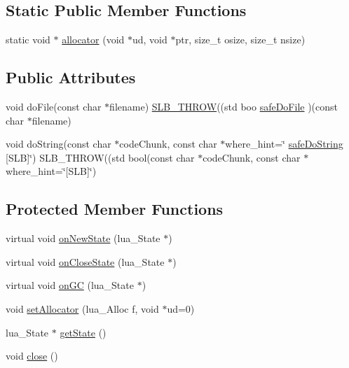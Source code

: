 \subsection*{Static Public Member Functions}
\begin{DoxyCompactItemize}
\item 
static void $\ast$ \hyperlink{classSLB_1_1Script_a7e26074d7437d72c2d6c4008a972ee17}{allocator} (void $\ast$ud, void $\ast$ptr, size\+\_\+t osize, size\+\_\+t nsize)
\end{DoxyCompactItemize}
\subsection*{Public Attributes}
\begin{DoxyCompactItemize}
\item 
void do\+File(const char $\ast$filename) \hyperlink{SLB_8hpp_a26bfc413cbc785925c2a46cfbab5d398}{S\+L\+B\+\_\+\+T\+H\+R\+OW}((std boo \hyperlink{classSLB_1_1Script_a98df15c9ceb5740e79b6ba3246265125}{safe\+Do\+File} )(const char $\ast$filename)
\item 
void do\+String(const char $\ast$code\+Chunk, const char $\ast$where\+\_\+hint=\char`\"{} \hyperlink{classSLB_1_1Script_a7ee7f0a0a77753eea4705df0ff3ec23c}{safe\+Do\+String} \mbox{[}S\+LB\mbox{]}\char`\"{}) S\+L\+B\+\_\+\+T\+H\+R\+OW((std bool(const char $\ast$code\+Chunk, const char $\ast$where\+\_\+hint=\char`\"{}\mbox{[}S\+LB\mbox{]}\char`\"{})
\end{DoxyCompactItemize}
\subsection*{Protected Member Functions}
\begin{DoxyCompactItemize}
\item 
virtual void \hyperlink{classSLB_1_1Script_a47ad9f9311e7c811bbbd0b2ae52ff053}{on\+New\+State} (lua\+\_\+\+State $\ast$)
\item 
virtual void \hyperlink{classSLB_1_1Script_ad35568c29c745f12da9905e4707e411a}{on\+Close\+State} (lua\+\_\+\+State $\ast$)
\item 
virtual void \hyperlink{classSLB_1_1Script_a5be6d5e78407aea5c9bc2256d1dac220}{on\+GC} (lua\+\_\+\+State $\ast$)
\item 
void \hyperlink{classSLB_1_1Script_acb29012f949e24af2345f78e83dc7a1a}{set\+Allocator} (lua\+\_\+\+Alloc f, void $\ast$ud=0)
\item 
lua\+\_\+\+State $\ast$ \hyperlink{classSLB_1_1Script_a11dc0b4f0c09d22558d1a5abdb184cbb}{get\+State} ()
\item 
void \hyperlink{classSLB_1_1Script_ab78ccc9cee734a099a166a1a4dd38d72}{close} ()
\end{DoxyCompactItemize}
